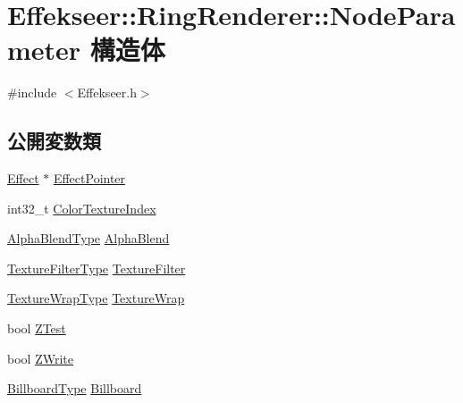 \hypertarget{struct_effekseer_1_1_ring_renderer_1_1_node_parameter}{}\section{Effekseer\+:\+:Ring\+Renderer\+:\+:Node\+Parameter 構造体}
\label{struct_effekseer_1_1_ring_renderer_1_1_node_parameter}


{\ttfamily \#include $<$Effekseer.\+h$>$}

\subsection*{公開変数類}
\begin{DoxyCompactItemize}
\item 
\mbox{\hyperlink{class_effekseer_1_1_effect}{Effect}} $\ast$ \mbox{\hyperlink{struct_effekseer_1_1_ring_renderer_1_1_node_parameter_ae1c9f002e049c0e9abeb566da9964ac5}{Effect\+Pointer}}
\item 
int32\+\_\+t \mbox{\hyperlink{struct_effekseer_1_1_ring_renderer_1_1_node_parameter_a79072a2a942423e1eb5c56dc5f6a1569}{Color\+Texture\+Index}}
\item 
\mbox{\hyperlink{namespace_effekseer_a8c32fd5b7ec7feed73314b2ae8086949}{Alpha\+Blend\+Type}} \mbox{\hyperlink{struct_effekseer_1_1_ring_renderer_1_1_node_parameter_a73f862f36c32e13c7e3109be755acad3}{Alpha\+Blend}}
\item 
\mbox{\hyperlink{namespace_effekseer_ae3518502cfcb4ec4991f13c0b3e4c6ee}{Texture\+Filter\+Type}} \mbox{\hyperlink{struct_effekseer_1_1_ring_renderer_1_1_node_parameter_aa1022172d7ccef9bc3ea615bd7d4f510}{Texture\+Filter}}
\item 
\mbox{\hyperlink{namespace_effekseer_a5320c83784602974b6278bf1a77b58a3}{Texture\+Wrap\+Type}} \mbox{\hyperlink{struct_effekseer_1_1_ring_renderer_1_1_node_parameter_a9c62da9c931b5c19c528f46cc5e1626d}{Texture\+Wrap}}
\item 
bool \mbox{\hyperlink{struct_effekseer_1_1_ring_renderer_1_1_node_parameter_a961db93480860064f1f432a6166e583e}{Z\+Test}}
\item 
bool \mbox{\hyperlink{struct_effekseer_1_1_ring_renderer_1_1_node_parameter_a26d4576d9bb81f221230f178637f352b}{Z\+Write}}
\item 
\mbox{\hyperlink{namespace_effekseer_a1e51959dc188f6f19acc48c85860c6d8}{Billboard\+Type}} \mbox{\hyperlink{struct_effekseer_1_1_ring_renderer_1_1_node_parameter_a834a9662e348bf4b79779586628530a5}{Billboard}}

\end{DoxyCompactItemize}
